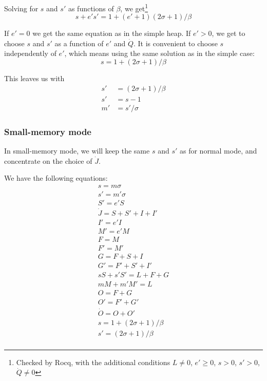 \documentclass{article}
\begin{document}
Solving for $s$ and $s'$ as functions of $\beta$, we get\footnote{
Checked by Rocq, with the additional conditions
$L \neq 0$,
$e' \ge 0$,
$s > 0$,
$s' > 0$,
$\dot{Q} \neq 0$
}
\begin{equation} \label{eqn-s'}
s + e' s' = 1 + (e'+1) (2\sigma+1)/\beta
\end{equation}

If $e' = 0$ we get the same equation as in the simple heap. If $e' >
0$, we get to choose $s$ and $s'$ as a function of $e'$ and
$\dot{Q}$. It is convenient to choose $s$ independently of $e'$,
which means using the same solution as in the simple case:
\begin{equation} \label{solution-s'}
s = 1 + (2\sigma+1)/\beta
\end{equation}

This leaves us with
\begin{align}
s' & = (2\sigma+1)/\beta \\
s' & = s - 1 \\
m' & = s' / \sigma
\end{align}


\subsubsection{Small-memory mode}

In small-memory mode, we will keep the same $s$ and $s'$ as for normal
mode, and concentrate on the choice of $\dot{J}$.

We have the following equations:
\begin{gather*}
s = m \sigma \\
s' = m' \sigma \\
S' = e'S \\
\dot{J} = S + S' + I + I'  \\
I' = e'I \\
M' = e'M \\
F = M \\
F' = M'  \\
G = F + S + I  \\
G' = F' + S' + I'  \\
sS + s'S' = L + F + G \\
mM + m'M' = L \\
O = F + G  \\
O' = F' + G' \\
\dot{O} = O + O'  \\
s = 1 + (2\sigma+1)/\beta \\
s' = (2\sigma+1)/\beta \\
\end{gather*}
\end{document}
